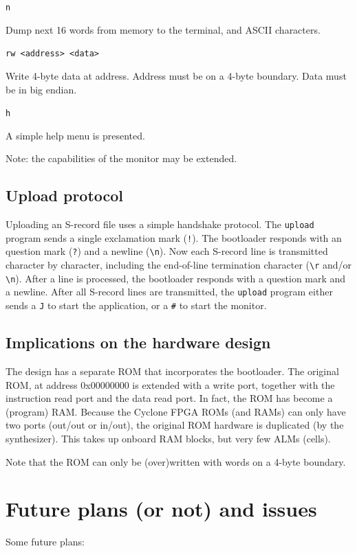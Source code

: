 \documentclass[12pt]{article}
\begin{document}
\lstinline|n|

Dump next 16 words from memory to the terminal, and ASCII characters.

\lstinline|rw <address> <data>|

Write 4-byte data at address. Address must be on a 4-byte boundary. Data must be in big endian.

\lstinline|h|

A simple help menu is presented.

Note: the capabilities of the monitor may be extended.

\subsection{Upload protocol}
Uploading an S-record file uses a simple handshake protocol. The \lstinline|upload| program sends a single exclamation mark (\lstinline|!|). The bootloader responds with an question mark (\lstinline|?|) and a newline (\lstinline|\n|). Now each S-record line is transmitted character by character, including the end-of-line termination character (\lstinline|\r| and/or \lstinline|\n|). After a line is processed, the bootloader responds with a question mark and a newline. After all S-record lines are transmitted, the \lstinline|upload| program either sends a \lstinline|J| to start the application, or a \lstinline|#| to start the monitor.

\subsection{Implications on the hardware design}
The design has a separate ROM that incorporates the bootloader. The original ROM, at address 0x00000000 is extended with a write port, together with the instruction read port and the data read port. In fact, the ROM has become a (program) RAM. Because the Cyclone FPGA ROMs (and RAMs) can only have two ports (out/out or in/out), the original ROM hardware is duplicated (by the synthesizer). This takes up onboard RAM blocks, but very few ALMs (cells). %

Note that the ROM can only be (over)written with words on a 4-byte boundary.

\section{Future plans (or not) and issues}
Some future plans:
\end{document}
